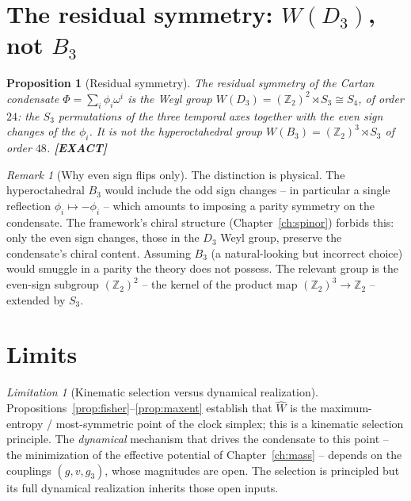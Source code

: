 \documentclass[11pt,oneside]{book}
\newcommand{\Wh}{\hat{W}}                         %
\newcommand{\Zt}{\mathbb{Z}_2}
\newcommand{\status}[1]{{\sffamily\bfseries\color{statuscol}[#1]}}
\theoremstyle{plain}
\newtheorem{proposition}[theorem]{Proposition}
\theoremstyle{definition}
\theoremstyle{remark}
\newtheorem{remark}[theorem]{Remark}
\newtheorem{limitation}[theorem]{Limitation}
\begin{document}
\section{The residual symmetry: $W(D_3)$, not $B_3$}
\label{sec:weyl}

\begin{proposition}[Residual symmetry]
\label{prop:weyl}
The residual symmetry of the Cartan condensate $\Phi=\sum_i\phi_i\omega^i$ is the
Weyl group $W(D_3)=(\Zt)^2\rtimes S_3\cong S_4$, of order $24$: the $S_3$
permutations of the three temporal axes together with the \emph{even} sign changes
of the $\phi_i$. It is \emph{not} the hyperoctahedral group
$W(B_3)=(\Zt)^3\rtimes S_3$ of order $48$. \status{EXACT}
\end{proposition}

\begin{remark}[Why even sign flips only]
The distinction is physical. The hyperoctahedral $B_3$ would include the odd sign
changes -- in particular a single reflection $\phi_i\mapsto-\phi_i$ -- which amounts
to imposing a parity symmetry on the condensate. The framework's chiral structure
(Chapter~\ref{ch:spinor}) forbids this: only the even sign changes, those in the
$D_3$ Weyl group, preserve the condensate's chiral content. Assuming $B_3$ (a
natural-looking but incorrect choice) would smuggle in a parity the theory does not
possess. The relevant group is the even-sign subgroup $(\Zt)^2$ -- the kernel of the
product map $(\Zt)^3\to\Zt$ -- extended by $S_3$.
\end{remark}

\section{Limits}
\label{sec:stat-limits}

\begin{limitation}[Kinematic selection versus dynamical realization]
\label{lim:stat}
Propositions~\ref{prop:fisher}--\ref{prop:maxent} establish that $\Wh$ is the
maximum-entropy / most-symmetric point of the clock simplex; this is a kinematic
selection principle. The \emph{dynamical} mechanism that drives the condensate to
this point -- the minimization of the effective potential of
Chapter~\ref{ch:mass} -- depends on the couplings $(g,v,g_3)$, whose magnitudes are
open. The selection is principled but its full dynamical realization inherits those
open inputs.
\end{limitation}
\end{document}
